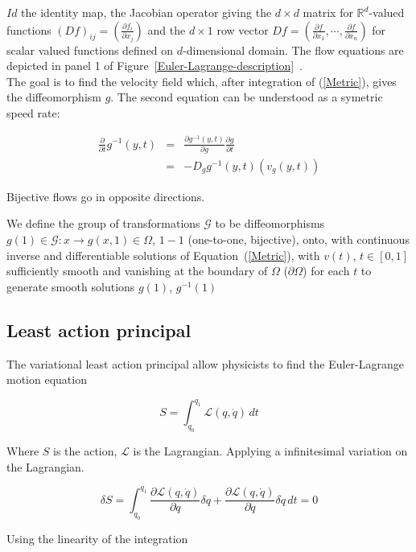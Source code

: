 \documentclass[final, paper=letter,5p,times,twocolumn]{elsarticle}
\theoremstyle{definition}
\begin{document}
$Id$ the identity map, the Jacobian operator giving the $d \times d$ matrix for $\mathbb{R}^{d}$-valued functions $(Df)_{ij} = (\frac{\partial f_{i}}{\partial x_{j}})$ and the $d \times 1$ row vector $Df = (\frac{\partial f}{\partial x_{1}}, \cdots, \frac{\partial f}{\partial x_{n}} )$ for scalar valued functions defined on $d$-dimensional domain. The flow equations are depicted in panel 1 of Figure~\ref{Euler-Lagrange-description}~\cite{pmid12117763}.\\
The goal is to find the velocity field which, after integration of (\ref{Metric}), gives the diffeomorphism $g$. The second equation can be understood as a symetric speed rate:

\begin{eqnarray*}
\frac{\partial}{\partial t}g^{-1}(y,t) & = & \frac{\partial g^{-1}(y,t)}{\partial g}\frac{\partial g}{\partial t} \\
& = & - D_{g} g^{-1}(y,t) (v_{g}(y,t))
\end{eqnarray*}

Bijective flows go in opposite directions.

\begin{definition}
We define the group of transformations $\mathcal{G}$ to be diffeomorphisms $g(1) \in \mathcal{G}: x \rightarrow g(x, 1) \in \Omega$, $1-1$ (one-to-one, bijective), onto, with continuous inverse and differentiable solutions of Equation~(\ref{Metric}), with $v(t)$, $t \in [0, 1]$ sufficiently smooth and vanishing at the boundary of $\Omega$ ($\partial \Omega$) for each $t$ to generate smooth solutions $g(1)$, $g^{-1}(1)$
\end{definition}

\subsection{Least action principal}

The variational least action principal allow physicists to find the Euler-Lagrange motion equation

$$
S = \int_{q_{0}}^{q_{1}} \mathcal{L}(q, \dot{q}) \, dt
$$

Where $S$ is the action, $\mathcal{L}$ is the Lagrangian. Applying a infinitesimal variation on the Lagrangian.

$$
\delta S =  \int_{q_{0}}^{q_{1}} \frac{\partial\mathcal{L}(q, \dot{q})}{\partial q} \delta q + \frac{\partial\mathcal{L}(q, \dot{q})}{\partial \dot{q}} \delta \dot{q} \, dt = 0
$$

Using the linearity of the integration
\end{document}
